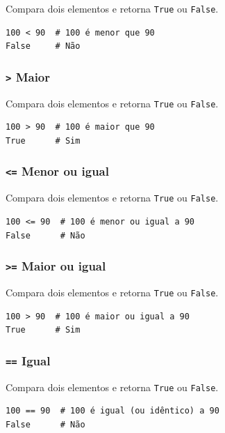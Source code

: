 \documentclass[]{book}
\begin{document}
Compara dois elementos e retorna \texttt{True} ou \texttt{False}.

\begin{verbatim}
100 < 90  # 100 é menor que 90
False     # Não
\end{verbatim}

\subsubsection{\texorpdfstring{\texttt{\textgreater{}}
Maior}{\textgreater{} Maior}}\label{maior}

Compara dois elementos e retorna \texttt{True} ou \texttt{False}.

\begin{verbatim}
100 > 90  # 100 é maior que 90
True      # Sim
\end{verbatim}

\subsubsection{\texorpdfstring{\texttt{\textless{}=} Menor ou
igual}{\textless{}= Menor ou igual}}\label{menor-ou-igual}

Compara dois elementos e retorna \texttt{True} ou \texttt{False}.

\begin{verbatim}
100 <= 90  # 100 é menor ou igual a 90
False      # Não
\end{verbatim}

\subsubsection{\texorpdfstring{\texttt{\textgreater{}=} Maior ou
igual}{\textgreater{}= Maior ou igual}}\label{maior-ou-igual}

Compara dois elementos e retorna \texttt{True} ou \texttt{False}.

\begin{verbatim}
100 > 90  # 100 é maior ou igual a 90
True      # Sim
\end{verbatim}

\subsubsection{\texorpdfstring{\texttt{==}
Igual}{== Igual}}\label{igual}

Compara dois elementos e retorna \texttt{True} ou \texttt{False}.

\begin{verbatim}
100 == 90  # 100 é igual (ou idêntico) a 90
False      # Não
\end{verbatim}
\end{document}

